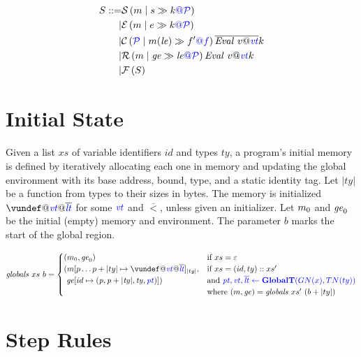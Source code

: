 \documentclass{llncs}
\begin{document}
\[\begin{aligned}
S ::= & \sstate{\PCT}{\mem}{\stmt}{\cont} \\
| & \estate{\PCT}{\mem}{\expr}{\cont} \\
| & \cstate{f}{\PCT}{\mem}{\lenv}{f'}{\overline{\val{v}{\vt}}}{\cont} \\
| & \rstate{\PCT}{\mem}{\genv}{\lenv}{\val{v}{\vt}}{\cont} \\
| & \fstate{S} \\
\end{aligned}\]

\section{Initial State}

Given a list \(xs\) of variable identifiers \(id\) and types
\(ty\), a program's initial memory is defined by iteratively allocating each one
in memory and updating the global environment with its base address, bound, type,
and a static identity tag. Let \(|ty|\) be a function from types to their sizes
in bytes. The memory is initialized \(\vundef@\vt@\overline{\lt}\)
for some \(\vt\) and \(\overline{\lt}\), unless given an initializer.
Let \(\mem_0\) and \(\genv_0\) be the initial (empty) memory and environment.
The parameter \(b\) marks the start of the global region.


\[\mathit{globals} ~ xs ~ b =
\begin{cases}
  (\mem_0, \genv_0) & \textnormal{if } xs = \varepsilon \\
  (\mem[p \dots p+|ty| \mapsto \vundef@\vt@\overline{\lt}]_{|ty|}, & \textnormal{if } xs = (id,ty)::xs' \\
  ~ \genv[id \mapsto (\mathit{p, p+|ty|,ty,\pt})]) & \textnormal{and } \trule{\globaltres}{\globalt} \\
  & \textnormal{where } (\mem,\genv) = \mathit{globals} ~ xs' ~ (b + |ty|) \\
\end{cases}\]

\section{Step Rules}
\label{app:rules}
\end{document}
